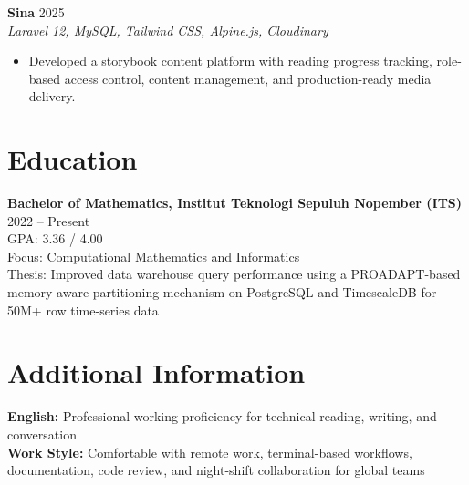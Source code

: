 \documentclass[a4paper,11pt]{article}
\begin{document}
\textbf{Sina} \hfill 2025 \\
\textit{Laravel 12, MySQL, Tailwind CSS, Alpine.js, Cloudinary}
\begin{itemize}
  \item Developed a storybook content platform with reading progress tracking, role-based access control, content management, and production-ready media delivery.
\end{itemize}

\section*{Education}
\textbf{Bachelor of Mathematics, Institut Teknologi Sepuluh Nopember (ITS)} \hfill 2022 -- Present \\
GPA: 3.36 / 4.00 \\
Focus: Computational Mathematics and Informatics \\
Thesis: Improved data warehouse query performance using a PROADAPT-based memory-aware partitioning mechanism on PostgreSQL and TimescaleDB for 50M+ row time-series data

\section*{Additional Information}
\textbf{English:} Professional working proficiency for technical reading, writing, and conversation \\
\textbf{Work Style:} Comfortable with remote work, terminal-based workflows, documentation, code review, and night-shift collaboration for global teams
\end{document}
